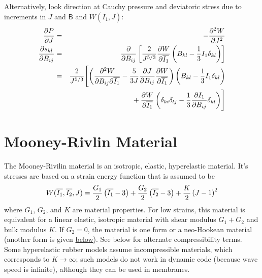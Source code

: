 \documentclass[11pt]{book}
\newcommand{\tens}[1]{\boldsymbol{\mathsf{#1}}}
\begin{document}
Alternatively, look direction at Cauchy pressure and deviatoric stress due to increments in $J$ and $\tens B$ and $W(\overline{I_1},J)$:
\begin{eqnarray}
    {\partial P\over \partial J} & = & - {\partial^2 W\over \partial J^2} \\
    {\partial s_{kl}\over\partial B_{ij}} & = &  {\partial\over \partial B_{ij}}
    \left[{2\over J^{5/3}}{\partial W\over \partial \overline{I_1}}\left(B_{kl}-{1\over3}I_1\delta_{kl}\right)\right] \\
    & = & {2\over J^{5/3}}\Biggl[\left({\partial^2 W\over \partial B_{ij}\partial \overline{I_1}}
        -{5\over 3J}{\partial J\over \partial B_{ij}}{\partial W\over \partial \overline{I_1}}\right)\left(B_{kl}-{1\over3}I_1\delta_{kl}\right)
    \nonumber\\
    &&\mbox{}
         +{\partial W\over \partial \overline{I_1}}
                  \left(\delta_{ki}\delta_{lj}-{1\over3}{\partial I_1\over\partial B_{ij}}\delta_{kl}\right)
           \Biggr]
\end{eqnarray}

\section{Mooney-Rivlin Material\label{MRM}}

The Mooney-Rivilin material is an isotropic, elastic, hyperelastic material. It's stresses are based on a strain energy function that is assumed to be
\begin{equation}
W(\overline{I_1},\overline{I_2},J)= {G_1\over2}\left(\overline{I_1}-3\right) + {G_2\over2}\left(\overline{I_2}-3\right) + {K\over2}\left(J-1\right)^2
\end{equation}
where $G_1$, $G_2$, and $K$ are material properties.
For low strains, this material is equivalent for a linear elastic, isotropic material with shear modulus $G_1+G_2$ and bulk modulus $K$. If $G_2=0$, the material is one form or a neo-Hookean material (another form is given \hyperref[NHM]{below}). See below for alternate compressibility terms. Some hyperelastic rubber models assume incompressible materials, which corresponds to $K\to\infty$; such models do not work in dynamic code (because wave speed is infinite), although they can be used in membranes.
\end{document}

